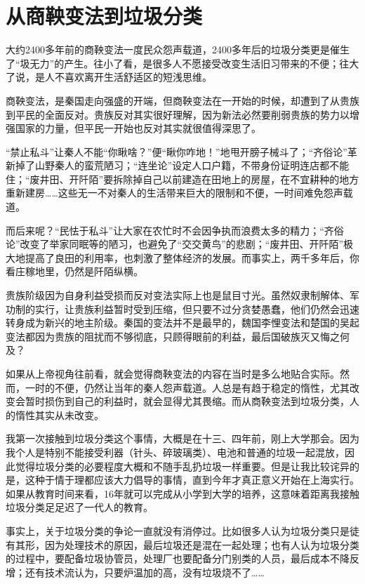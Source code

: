 \documentclass[]{book}
\begin{document}
\hypertarget{ux4eceux5546ux9785ux53d8ux6cd5ux5230ux5783ux573eux5206ux7c7b}{%
\section{从商鞅变法到垃圾分类}\label{ux4eceux5546ux9785ux53d8ux6cd5ux5230ux5783ux573eux5206ux7c7b}}

大约2400多年前的商鞅变法一度民众怨声载道，2400多年后的垃圾分类更是催生了``圾无力''的产生。往小了看，是很多人不愿接受改变生活旧习带来的不便；往大了说，是人不喜欢离开生活舒适区的短浅思维。

商鞅变法，是秦国走向强盛的开端，但商鞅变法在一开始的时候，却遭到了从贵族到平民的全面反对。贵族反对其实很好理解，因为新法必然要削弱贵族的势力以增强国家的力量，但平民一开始也反对其实就很值得深思了。

``禁止私斗''让秦人不能``你瞅啥？''便``瞅你咋地！''地甩开膀子械斗了；``齐俗论''革新掉了山野秦人的蛮荒陋习；``连坐论''设定人口户籍，不带身份证明连店都不能住；``废井田、开阡陌''要拆除掉自己以前建造在田地上的房屋，在不宜耕种的地方重新建房\ldots{}\ldots{}这些无一不对秦人的生活带来巨大的限制和不便，一时间难免怨声载道。

而后来呢？``民怯于私斗''让大家在农忙时不会因争执而浪费太多的精力；``齐俗论''改变了举家同眠等的陋习，也避免了``交交黄鸟''的悲剧；``废井田、开阡陌''极大地提高了良田的利用率，也刺激了整体经济的发展。而事实上，两千多年后，你看庄稼地里，仍然是阡陌纵横。

贵族阶级因为自身利益受损而反对变法实际上也是鼠目寸光。虽然奴隶制解体、军功制的实行，让贵族利益暂时受到压缩，但只要不过分贪婪愚蠢，他们仍然会迅速转身成为新兴的地主阶级。秦国的变法并不是最早的，魏国李悝变法和楚国的吴起变法都因为贵族的阻扰而不够彻底，只顾得眼前的利益，最后国破族灭又悔之何及？

如果从上帝视角往前看，就会觉得商鞅变法的内容在当时是多么地贴合实际。然而，一时的不便，仍然让当年的秦人怨声载道。人总是有趋于稳定的惰性，尤其改变会暂时损伤到自己的利益时，就会显得尤其畏缩。而从商鞅变法到垃圾分类，人的惰性其实从未改变。

我第一次接触到垃圾分类这个事情，大概是在十三、四年前，刚上大学那会。因为我个人是特别不能接受利器（针头、碎玻璃类）、电池和普通的垃圾一起混放，因此觉得垃圾分类的必要程度大概和不随手乱扔垃圾一样重要。但是让我比较诧异的是，这种于情于理都应该大力倡导的事情，直到今年才真正意义开始在上海实行。如果从教育时间来看，16年就可以完成从小学到大学的培养，这意味着距离我接触垃圾分类足足迟了一代人的教育。

事实上，关于垃圾分类的争论一直就没有消停过。比如很多人认为垃圾分类只是徒有其形，因为处理技术的原因，最后垃圾还是混在一起处理；也有人认为垃圾分类的过程中，要配备垃圾协管员，处理厂也要配备分门别类的人员，最后成本不降反增；还有技术流认为，只要炉温加的高，没有垃圾烧不了\ldots{}\ldots{}
\end{document}
